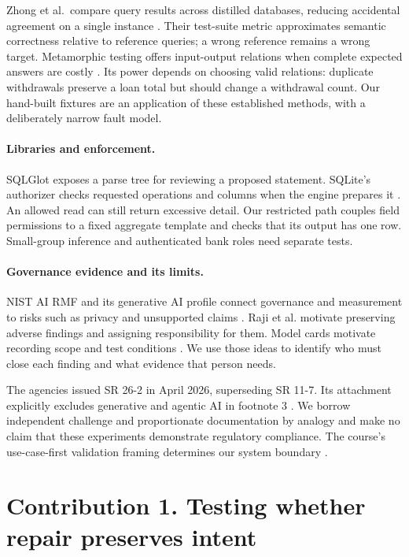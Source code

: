 \documentclass[11pt,a4paper,onecolumn,oneside]{rho-class/rho}
\begin{document}
Zhong et al.\ compare query results across distilled databases, reducing accidental agreement on a single instance \citep{zhong}. Their test-suite metric approximates semantic correctness relative to reference queries; a wrong reference remains a wrong target. Metamorphic testing offers input-output relations when complete expected answers are costly \citep{metamorphic}. Its power depends on choosing valid relations: duplicate withdrawals preserve a loan total but should change a withdrawal count. Our hand-built fixtures are an application of these established methods, with a deliberately narrow fault model.

\paragraph{Libraries and enforcement.}
SQLGlot exposes a parse tree for reviewing a proposed statement. SQLite's authorizer checks requested operations and columns when the engine prepares it \citep{sqlglot,sqlite}. An allowed read can still return excessive detail. Our restricted path couples field permissions to a fixed aggregate template and checks that its output has one row. Small-group inference and authenticated bank roles need separate tests.

\paragraph{Governance evidence and its limits.}
NIST AI RMF and its generative AI profile connect governance and measurement to risks such as privacy and unsupported claims \citep{airmf,genai}. Raji et al. motivate preserving adverse findings and assigning responsibility for them. Model cards motivate recording scope and test conditions \citep{raji,modelcards}. We use those ideas to identify who must close each finding and what evidence that person needs.

The agencies issued SR 26-2 in April 2026, superseding SR 11-7. Its attachment explicitly excludes generative and agentic AI in footnote 3 \citep{sr26}. We borrow independent challenge and proportionate documentation by analogy and make no claim that these experiments demonstrate regulatory compliance. The course's use-case-first validation framing determines our system boundary \citep{course}.

\clearpage

\section{Contribution 1. Testing whether repair preserves intent}
\end{document}
